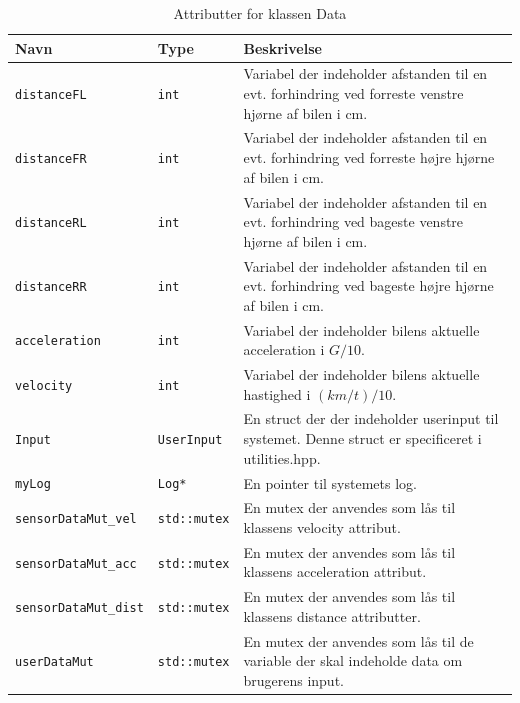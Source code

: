 \begin{table}[h]
\begin{tabularx}{\textwidth}{| Z | Z | L{8cm} |} \hline
Navn & Type & Beskrivelse \\\hline

\texttt{distanceFL} & \texttt{int} &Variabel der indeholder afstanden til en evt. forhindring ved forreste venstre hjørne af bilen i cm.\\\hline

\texttt{distanceFR} & \texttt{int} &Variabel der indeholder afstanden til en evt. forhindring ved forreste højre hjørne af bilen i cm.\\\hline

\texttt{distanceRL} & \texttt{int} &Variabel der indeholder afstanden til en evt. forhindring ved bageste venstre hjørne af bilen i cm.\\\hline

\texttt{distanceRR} & \texttt{int} &Variabel der indeholder afstanden til en evt. forhindring ved bageste højre hjørne af bilen i cm.\\\hline

\texttt{acceleration} & \texttt{int} &Variabel der indeholder bilens aktuelle acceleration i $G / 10$.\\\hline

\texttt{velocity} & \texttt{int} &Variabel der indeholder bilens aktuelle hastighed i $(km/t)/ 10$.\\\hline

\texttt{Input} & \texttt{UserInput} &En struct der der indeholder userinput til systemet. Denne struct er specificeret i utilities.hpp.\\\hline

\texttt{myLog} & \texttt{Log*} &En pointer til systemets log.\\\hline

\texttt{sensorDataMut\_vel} & \texttt{std::mutex} &En mutex der anvendes som lås til klassens velocity attribut.\\\hline

\texttt{sensorDataMut\_acc} & \texttt{std::mutex} &En mutex der anvendes som lås til klassens acceleration attribut.\\\hline

\texttt{sensorDataMut\_dist} & \texttt{std::mutex} &En mutex der anvendes som lås til klassens distance attributter.\\\hline

\texttt{userDataMut} & \texttt{std::mutex} &En mutex der anvendes som lås til de variable der skal indeholde data om brugerens input.\\\hline

\end{tabularx}
\caption{Attributter for klassen Data}
\label{table:attr_data}
\end{table}

